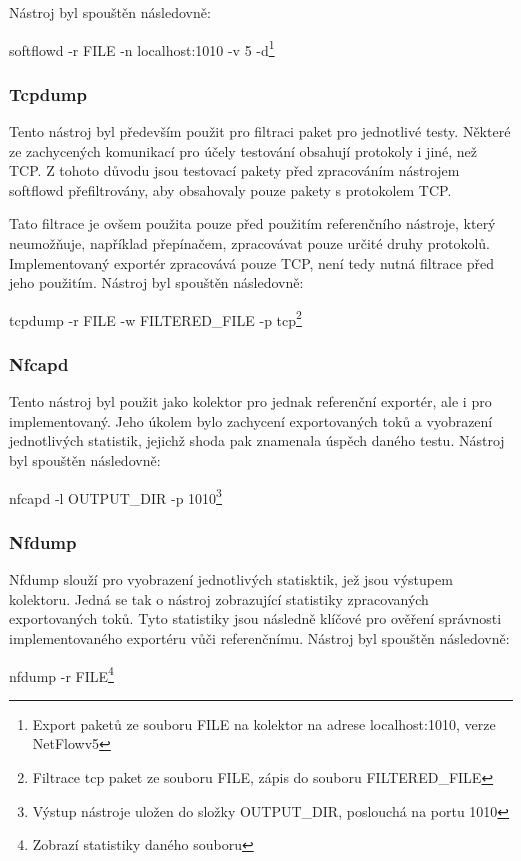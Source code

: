 \documentclass[11pt, a4paper, hidelinks]{article}[08.10.2023]
\begin{document}
    Nástroj byl spouštěn následovně:
    \begin{center}
        softflowd -r FILE -n localhost:1010 -v 5 -d\footnote{Export paketů ze souboru FILE na kolektor na adrese localhost:1010, verze NetFlowv5}
    \end{center}

    \subsubsection{Tcpdump}
    Tento nástroj byl především použit pro filtraci paket pro jednotlivé testy. Některé ze zachycených komunikací pro účely testování obsahují protokoly i jiné, než TCP. Z tohoto důvodu jsou testovací pakety před zpracováním nástrojem softflowd přefiltrovány, aby obsahovaly pouze pakety s protokolem TCP. 
    
    Tato filtrace je ovšem použita pouze před použitím referenčního nástroje, který neumožňuje, například přepínačem, zpracovávat pouze určité druhy protokolů. Implementovaný exportér zpracovává pouze TCP, není tedy nutná filtrace před jeho použitím.
    Nástroj byl spouštěn následovně:

    \begin{center}
        tcpdump -r FILE -w FILTERED\_FILE -p tcp\footnote{Filtrace tcp paket ze souboru FILE, zápis do souboru FILTERED\_FILE}
    \end{center}

    \subsubsection{Nfcapd}\label{collector}
    Tento nástroj byl použit jako kolektor pro jednak referenční exportér, ale i pro implementovaný. Jeho úkolem bylo zachycení exportovaných toků a vyobrazení jednotlivých statistik, jejichž shoda pak znamenala úspěch daného testu.
    Nástroj byl spouštěn následovně:

    \begin{center}
        nfcapd -l OUTPUT\_DIR -p 1010\footnote{Výstup nástroje uložen do složky OUTPUT\_DIR, poslouchá na portu 1010}
    \end{center}

    \subsubsection{Nfdump}
    Nfdump slouží pro vyobrazení jednotlivých statisktik, jež jsou výstupem kolektoru. 
    Jedná se tak o nástroj zobrazující statistiky zpracovaných exportovaných toků. Tyto statistiky jsou následně klíčové pro ověření správnosti implementovaného exportéru vůči referenčnímu.
    Nástroj byl spouštěn následovně:
    \begin{center}
        nfdump -r FILE\footnote{Zobrazí statistiky daného souboru}
    \end{center}
\end{document}
